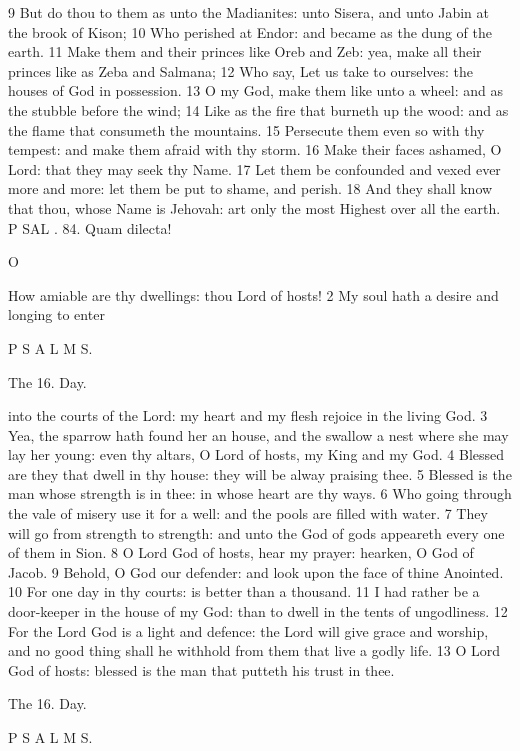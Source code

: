 9 But do thou to them as unto the Madianites: unto Sisera, and unto Jabin at the brook of Kison; 10 Who perished at Endor: and became as the dung of the earth. 11 Make them and their princes like Oreb and Zeb: yea, make all their princes like as Zeba and Salmana; 12 Who say, Let us take to ourselves: the houses of God in possession. 13 O my God, make them like unto a wheel: and as the stubble before the wind; 14 Like as the fire that burneth up the wood: and as the flame that consumeth the mountains. 15 Persecute them even so with thy tempest: and make them afraid with thy storm. 16 Make their faces ashamed, O Lord: that they may seek thy Name. 17 Let them be confounded and vexed ever more and more: let them be put to shame, and perish. 18 And they shall know that thou, whose Name is Jehovah: art only the most Highest over all the earth. P SAL . 84. Quam dilecta!

O

How amiable are thy dwellings: thou Lord of hosts! 2 My soul hath a desire and longing to enter

P S A L M S.

The 16. Day.

into the courts of the Lord: my heart and my flesh rejoice in the living God. 3 Yea, the sparrow hath found her an house, and the swallow a nest where she may lay her young: even thy altars, O Lord of hosts, my King and my God. 4 Blessed are they that dwell in thy house: they will be alway praising thee. 5 Blessed is the man whose strength is in thee: in whose heart are thy ways. 6 Who going through the vale of misery use it for a well: and the pools are filled with water. 7 They will go from strength to strength: and unto the God of gods appeareth every one of them in Sion. 8 O Lord God of hosts, hear my prayer: hearken, O God of Jacob. 9 Behold, O God our defender: and look upon the face of thine Anointed. 10 For one day in thy courts: is better than a thousand. 11 I had rather be a door-keeper in the house of my God: than to dwell in the tents of ungodliness. 12 For the Lord God is a light and defence: the Lord will give grace and worship, and no good thing shall he withhold from them that live a godly life. 13 O Lord God of hosts: blessed is the man that putteth his trust in thee.

The 16. Day.

P S A L M S.


